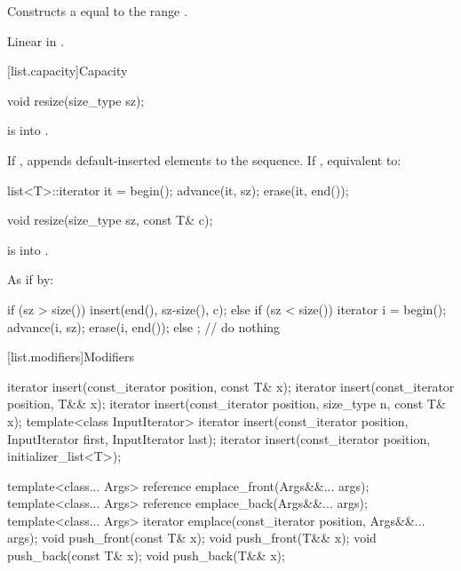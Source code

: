 \begin{itemdescr}
\pnum
\effects
Constructs a
equal to the range
.

\pnum
\complexity
Linear in
.
\end{itemdescr}

[list.capacity]{Capacity}

%
\begin{itemdecl}
void resize(size_type sz);
\end{itemdecl}

\begin{itemdescr}
\pnum
\expects
{} is  into .

\pnum
\effects
If ,
appends  default-inserted elements to the
sequence.
If , equivalent to:

\begin{codeblock}
list<T>::iterator it = begin();
advance(it, sz);
erase(it, end());
\end{codeblock}
\end{itemdescr}

%
\begin{itemdecl}
void resize(size_type sz, const T& c);
\end{itemdecl}

\begin{itemdescr}
\pnum
\expects
{} is  into .

\pnum
\effects
As if by:
\begin{codeblock}
if (sz > size())
  insert(end(), sz-size(), c);
else if (sz < size()) {
  iterator i = begin();
  advance(i, sz);
  erase(i, end());
}
else
  ;                 // do nothing
\end{codeblock}
\end{itemdescr}

[list.modifiers]{Modifiers}

%
\begin{itemdecl}
iterator insert(const_iterator position, const T& x);
iterator insert(const_iterator position, T&& x);
iterator insert(const_iterator position, size_type n, const T& x);
template<class InputIterator>
  iterator insert(const_iterator position, InputIterator first,
                  InputIterator last);
iterator insert(const_iterator position, initializer_list<T>);

template<class... Args> reference emplace_front(Args&&... args);
template<class... Args> reference emplace_back(Args&&... args);
template<class... Args> iterator emplace(const_iterator position, Args&&... args);
void push_front(const T& x);
void push_front(T&& x);
void push_back(const T& x);
void push_back(T&& x);
\end{itemdecl}

